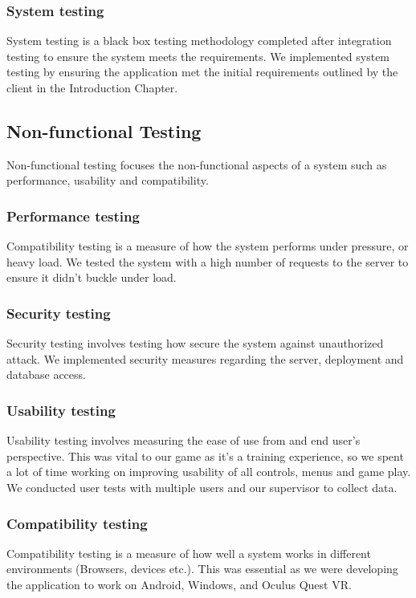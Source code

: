 \subsubsection{System testing}
System testing is a black box testing methodology completed after integration testing to ensure the system meets the requirements. We implemented system testing by ensuring the application met the initial requirements outlined by the client in the Introduction Chapter.

\subsection{Non-functional Testing}
Non-functional testing focuses the non-functional aspects of a system such as performance, usability and compatibility.

\subsubsection{Performance testing}
Compatibility testing is a measure of how the system performs under pressure, or heavy load. We tested the system with a high number of requests to the server to ensure it didn't buckle under load.

\subsubsection{Security testing}
Security testing involves testing how secure the system against unauthorized attack. We implemented security measures regarding the server, deployment and database access.

\subsubsection{Usability testing}
Usability testing involves measuring the ease of use from and end user’s perspective. This was vital to our game as it's a training experience, so we spent a lot of time working on improving usability of all controls, menus and game play. We conducted user tests with multiple users and our supervisor to collect data.

\subsubsection{Compatibility testing}
Compatibility testing is a measure of how well a system works in different environments (Browsers, devices etc.). This was essential as we were developing the application to work on Android, Windows, and Oculus Quest VR.

